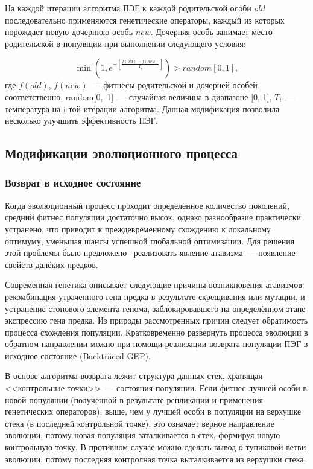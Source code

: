 На каждой итерации алгоритма ПЭГ к каждой родительской особи $old$ последовательно применяются генетические операторы, каждый из которых порождает новую дочернюю особь $new$. Дочерняя особь занимает место родительской в популяции при выполнении следующего условия:

\begin{equation}
\label{eq:anneal_simulation}
\min(1, e^{-\left\lbrack\frac{f(old) - f(new)}{T_i}\right\rbrack}) > random[0, 1],
\end{equation}
где $f(old)$, $f(new)$~--- фитнесы родительской и дочерней особей соответственно, \mbox{random[0, 1]}~--- случайная величина в диапазоне [0, 1], $T_i$~--- температура на i-той итерации алгоритма. Данная модификация позволила несколько улучшить эффективность ПЭГ.


\subsection{Модификации эволюционного процесса}

\subsubsection{Возврат в исходное состояние}

Когда эволюционный процесс проходит определённое количество поколений, средний фитнес популяции достаточно высок, однако разнообразие практически устранено, что приводит к преждевременному схождению к локальному оптимуму, уменьшая шансы успешной глобальной оптимизации. Для решения этой проблемы было предложено~\cite{zhong2006improve} реализовать явление атавизма~--- появление свойств далёких предков. 

Современная генетика описывает следующие причины возникновения атавизмов: рекомбинация утраченного гена предка в результате скрещивания или мутации, и устранение стопового элемента генома, заблокировавшего на определённом этапе экспрессию гена предка. Из природы рассмотренных причин следует обратимость процесса схождения популяции. Кратковременно развернуть процесса эволюции в обратном направлении можно при помощи реализации возврата популяции ПЭГ в исходное состояние (Backtraced GEP).

В основе алгоритма возврата лежит структура данных стек, хранящая <<контрольные точки>>~--- состояния популяции. Если фитнес лучшей особи в новой популяции (полученной в результате репликации и применения генетических операторов), выше, чем у лучшей особи в популяции на верхушке стека (в последней контрольной точке), это означает верное направление эволюции, потому новая популяция заталкивается в стек, формируя новую контрольную точку. В противном случае можно сделать вывод о тупиковой ветви эволюции, потому последняя контролная точка выталкивается из верхушки стека.

